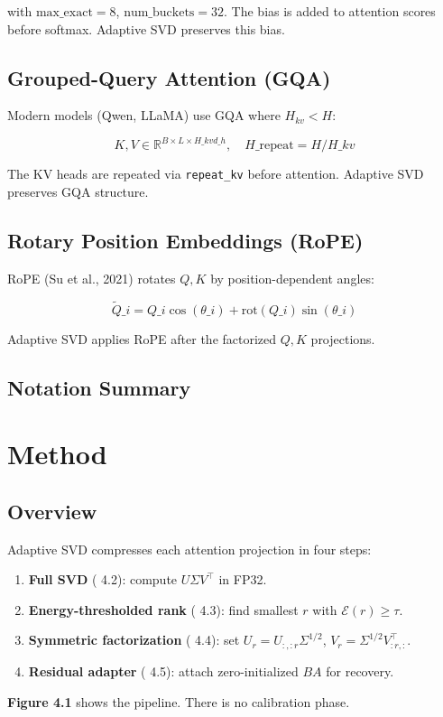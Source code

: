 with $\text{max\_exact} = 8$, $\text{num\_buckets} = 32$. The bias is added 
to attention scores before softmax. Adaptive SVD preserves this bias.

\subsection{Grouped-Query Attention (GQA)}

Modern models (Qwen, LLaMA) use GQA where $H_{kv} < H$:

\[
K, V \in \mathbb{R}^{B \times L \times H\_{kv} d\_h}, \quad H\_\text{repeat} = H / H\_{kv}
\tag{3.11}
\]

The KV heads are repeated via \texttt{repeat\_kv} before attention. Adaptive SVD 
preserves GQA structure.

\subsection{Rotary Position Embeddings (RoPE)}

RoPE (Su et al., 2021) rotates $Q, K$ by position-dependent angles:

\[
\tilde{Q}\_i = Q\_i \cos(\theta\_i) + \mathrm{rot}(Q\_i) \sin(\theta\_i)
\tag{3.12}
\]

Adaptive SVD applies RoPE after the factorized $Q, K$ projections.

\subsection{Notation Summary}



\section{Method}

\subsection{Overview}

Adaptive SVD compresses each attention projection in four steps:

\begin{enumerate}
\item \textbf{Full SVD} ( 4.2): compute $U \Sigma V^\top$ in FP32.
\item \textbf{Energy-thresholded rank} ( 4.3): find smallest $r$ with $\mathcal{E}(r) \geq \tau$.
\item \textbf{Symmetric factorization} ( 4.4): set $U_r = U_{:, :r} \Sigma^{1/2}$,
  $V_r = \Sigma^{1/2} V_{:r, :}^\top$.
\item \textbf{Residual adapter} ( 4.5): attach zero-initialized $B A$ for recovery.

\end{enumerate}
\textbf{Figure 4.1} shows the pipeline. There is no calibration phase.

